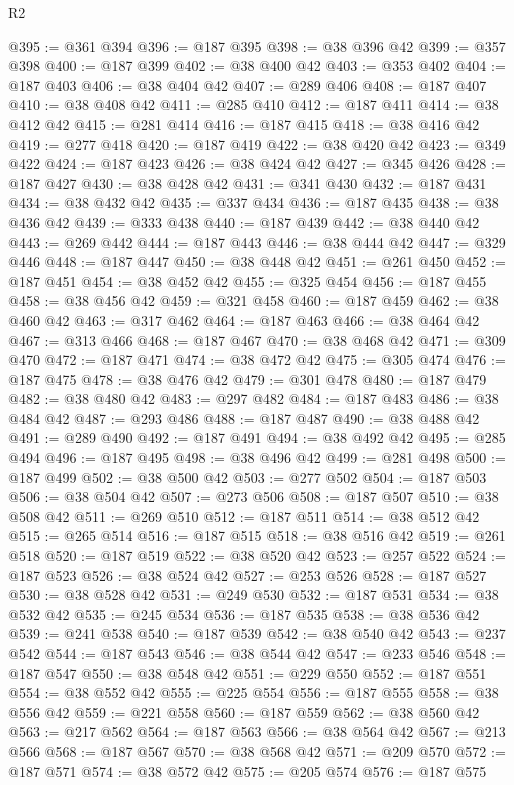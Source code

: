\begin{lexlean}{R2}
\begin{coremodule}
@395 := @361 @394
@396 := @187 @395
@398 := @38 @396 @42
@399 := @357 @398
@400 := @187 @399
@402 := @38 @400 @42
@403 := @353 @402
@404 := @187 @403
@406 := @38 @404 @42
@407 := @289 @406
@408 := @187 @407
@410 := @38 @408 @42
@411 := @285 @410
@412 := @187 @411
@414 := @38 @412 @42
@415 := @281 @414
@416 := @187 @415
@418 := @38 @416 @42
@419 := @277 @418
@420 := @187 @419
@422 := @38 @420 @42
@423 := @349 @422
@424 := @187 @423
@426 := @38 @424 @42
@427 := @345 @426
@428 := @187 @427
@430 := @38 @428 @42
@431 := @341 @430
@432 := @187 @431
@434 := @38 @432 @42
@435 := @337 @434
@436 := @187 @435
@438 := @38 @436 @42
@439 := @333 @438
@440 := @187 @439
@442 := @38 @440 @42
@443 := @269 @442
@444 := @187 @443
@446 := @38 @444 @42
@447 := @329 @446
@448 := @187 @447
@450 := @38 @448 @42
@451 := @261 @450
@452 := @187 @451
@454 := @38 @452 @42
@455 := @325 @454
@456 := @187 @455
@458 := @38 @456 @42
@459 := @321 @458
@460 := @187 @459
@462 := @38 @460 @42
@463 := @317 @462
@464 := @187 @463
@466 := @38 @464 @42
@467 := @313 @466
@468 := @187 @467
@470 := @38 @468 @42
@471 := @309 @470
@472 := @187 @471
@474 := @38 @472 @42
@475 := @305 @474
@476 := @187 @475
@478 := @38 @476 @42
@479 := @301 @478
@480 := @187 @479
@482 := @38 @480 @42
@483 := @297 @482
@484 := @187 @483
@486 := @38 @484 @42
@487 := @293 @486
@488 := @187 @487
@490 := @38 @488 @42
@491 := @289 @490
@492 := @187 @491
@494 := @38 @492 @42
@495 := @285 @494
@496 := @187 @495
@498 := @38 @496 @42
@499 := @281 @498
@500 := @187 @499
@502 := @38 @500 @42
@503 := @277 @502
@504 := @187 @503
@506 := @38 @504 @42
@507 := @273 @506
@508 := @187 @507
@510 := @38 @508 @42
@511 := @269 @510
@512 := @187 @511
@514 := @38 @512 @42
@515 := @265 @514
@516 := @187 @515
@518 := @38 @516 @42
@519 := @261 @518
@520 := @187 @519
@522 := @38 @520 @42
@523 := @257 @522
@524 := @187 @523
@526 := @38 @524 @42
@527 := @253 @526
@528 := @187 @527
@530 := @38 @528 @42
@531 := @249 @530
@532 := @187 @531
@534 := @38 @532 @42
@535 := @245 @534
@536 := @187 @535
@538 := @38 @536 @42
@539 := @241 @538
@540 := @187 @539
@542 := @38 @540 @42
@543 := @237 @542
@544 := @187 @543
@546 := @38 @544 @42
@547 := @233 @546
@548 := @187 @547
@550 := @38 @548 @42
@551 := @229 @550
@552 := @187 @551
@554 := @38 @552 @42
@555 := @225 @554
@556 := @187 @555
@558 := @38 @556 @42
@559 := @221 @558
@560 := @187 @559
@562 := @38 @560 @42
@563 := @217 @562
@564 := @187 @563
@566 := @38 @564 @42
@567 := @213 @566
@568 := @187 @567
@570 := @38 @568 @42
@571 := @209 @570
@572 := @187 @571
@574 := @38 @572 @42
@575 := @205 @574
@576 := @187 @575

\end{coremodule}
\end{lexlean}
